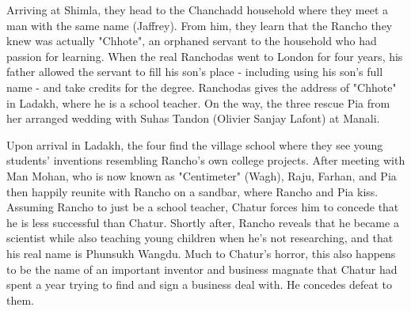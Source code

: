 \documentclass{article}
\begin{document}
Arriving at Shimla, they head to the Chanchadd household where they meet a man with the same name (Jaffrey). From him, they learn that the Rancho they knew was actually "Chhote", an orphaned servant to the household who had passion for learning. When the real Ranchodas went to London for four years, his father allowed the servant to fill his son's place - including using his son's full name - and take credits for the degree. Ranchodas gives the address of "Chhote" in Ladakh, where he is a school teacher. On the way, the three rescue Pia from her arranged wedding with Suhas Tandon (Olivier Sanjay Lafont) at Manali.

Upon arrival in Ladakh, the four find the village school where they see young students' inventions resembling Rancho's own college projects. After meeting with Man Mohan, who is now known as "Centimeter" (Wagh), Raju, Farhan, and Pia then happily reunite with Rancho on a sandbar, where Rancho and Pia kiss. Assuming Rancho to just be a school teacher, Chatur forces him to concede that he is less successful than Chatur. Shortly after, Rancho reveals that he became a scientist while also teaching young children when he's not researching, and that his real name is Phunsukh Wangdu. Much to Chatur's horror, this also happens to be the name of an important inventor and business magnate that Chatur had spent a year trying to find and sign a business deal with. He concedes defeat to them.
\end{document}
